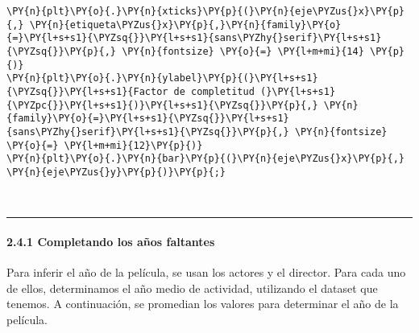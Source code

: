 \begin{tcolorbox}[breakable, size=fbox, boxrule=1pt, pad at break*=1mm,colback=cellbackground, colframe=cellborder]
\begin{Verbatim}[commandchars=\\\{\}]
\PY{n}{plt}\PY{o}{.}\PY{n}{xticks}\PY{p}{(}\PY{n}{eje\PYZus{}x}\PY{p}{,} \PY{n}{etiqueta\PYZus{}x}\PY{p}{,}\PY{n}{family}\PY{o}{=}\PY{l+s+s1}{\PYZsq{}}\PY{l+s+s1}{sans\PYZhy{}serif}\PY{l+s+s1}{\PYZsq{}}\PY{p}{,} \PY{n}{fontsize} \PY{o}{=} \PY{l+m+mi}{14} \PY{p}{)}
\PY{n}{plt}\PY{o}{.}\PY{n}{ylabel}\PY{p}{(}\PY{l+s+s1}{\PYZsq{}}\PY{l+s+s1}{Factor de completitud (}\PY{l+s+s1}{\PYZpc{}}\PY{l+s+s1}{)}\PY{l+s+s1}{\PYZsq{}}\PY{p}{,} \PY{n}{family}\PY{o}{=}\PY{l+s+s1}{\PYZsq{}}\PY{l+s+s1}{sans\PYZhy{}serif}\PY{l+s+s1}{\PYZsq{}}\PY{p}{,} \PY{n}{fontsize} \PY{o}{=} \PY{l+m+mi}{12}\PY{p}{)}
\PY{n}{plt}\PY{o}{.}\PY{n}{bar}\PY{p}{(}\PY{n}{eje\PYZus{}x}\PY{p}{,} \PY{n}{eje\PYZus{}y}\PY{p}{)}\PY{p}{;}
\end{Verbatim}
\end{tcolorbox}

    \begin{center}
    \end{center}
    { \hspace*{\fill} \\}
    
    \begin{center}\rule{0.5\linewidth}{0.5pt}\end{center}

\hypertarget{completando-los-auxf1os-faltantes}{%
\paragraph{2.4.1 Completando los años
faltantes}\label{completando-los-auxf1os-faltantes}}

Para inferir el año de la película, se usan los actores y el director.
Para cada uno de ellos, determinamos el año medio de actividad,
utilizando el dataset que tenemos. A continuación, se promedian los
valores para determinar el año de la película.

